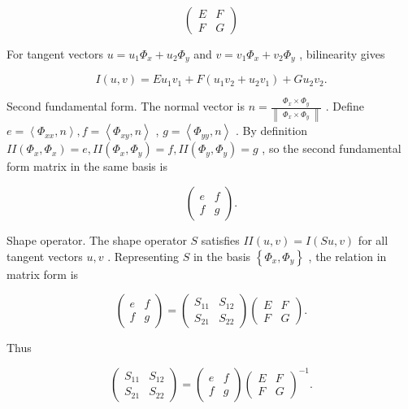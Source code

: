 \documentclass[10pt]{article}
\begin{document}
\[
\left( \begin{array}{ll} E & F \\  F & G \end{array}\right)
\]

For tangent vectors \(u = {u}_{1}{\Phi }_{x} + {u}_{2}{\Phi }_{y}\) and \(v = {v}_{1}{\Phi }_{x} + {v}_{2}{\Phi }_{y}\) , bilinearity gives

\[
I\left( {u,v}\right)  = E{u}_{1}{v}_{1} + F\left( {{u}_{1}{v}_{2} + {u}_{2}{v}_{1}}\right)  + G{u}_{2}{v}_{2}.
\]

Second fundamental form. The normal vector is \(n = \frac{{\Phi }_{x} \times  {\Phi }_{y}}{\begin{Vmatrix}{\Phi }_{x} \times  {\Phi }_{y}\end{Vmatrix}}\) . Define \(e = \left\langle  {{\Phi }_{xx},n}\right\rangle  ,f = \left\langle  {{\Phi }_{xy},n}\right\rangle\) , \(g = \left\langle  {{\Phi }_{yy},n}\right\rangle\) . By definition \({II}\left( {{\Phi }_{x},{\Phi }_{x}}\right)  = e,{II}\left( {{\Phi }_{x},{\Phi }_{y}}\right)  = f,{II}\left( {{\Phi }_{y},{\Phi }_{y}}\right)  = g\) , so the second fundamental form matrix in the same basis is

\[
\left( \begin{array}{ll} e & f \\  f & g \end{array}\right) .
\]

Shape operator. The shape operator \(S\) satisfies \({II}\left( {u,v}\right)  = I\left( {{Su},v}\right)\) for all tangent vectors \(u,v\) . Representing \(S\) in the basis \(\left\{  {{\Phi }_{x},{\Phi }_{y}}\right\}\) , the relation in matrix form is

\[
\left( \begin{array}{ll} e & f \\  f & g \end{array}\right)  = \left( \begin{array}{ll} {S}_{11} & {S}_{12} \\  {S}_{21} & {S}_{22} \end{array}\right) \left( \begin{array}{ll} E & F \\  F & G \end{array}\right) .
\]

Thus

\[
\left( \begin{array}{ll} {S}_{11} & {S}_{12} \\  {S}_{21} & {S}_{22} \end{array}\right)  = \left( \begin{array}{ll} e & f \\  f & g \end{array}\right) {\left( \begin{array}{ll} E & F \\  F & G \end{array}\right) }^{-1}.
\]
\end{document}
